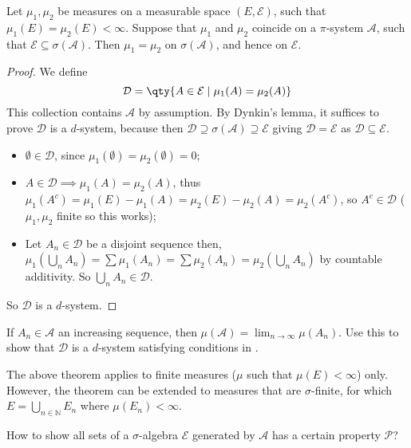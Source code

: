 \begin{theorem} \label{thm:uni}
	Let $\mu_1, \mu_2$ be measures on a measurable space $(E, \mathcal E)$, such that $\mu_1(E) = \mu_2(E) < \infty$.
	Suppose that $\mu_1$ and $\mu_2$ coincide on a $\pi$-system $\mathcal A$, such that $\mathcal E \subseteq \sigma(\mathcal A)$.
	Then $\mu_1 = \mu_2$ on $\sigma(\mathcal A)$, and hence on $\mathcal E$.
\end{theorem}

\begin{proof}
	We define
	\[ \mathcal D = \qty{A \in \mathcal E \mid \mu_1(A) = \mu_2(A)} \]
	This collection contains $\mathcal A$ by assumption.
	By Dynkin's lemma, it suffices to prove $\mathcal D$ is a $d$-system, because then $\mathcal D \supseteq \sigma(\mathcal A) \supseteq \mathcal E$ giving $\mathcal D = \mathcal E$ as $\mathcal{D} \subseteq \mathcal{E}$.

	\begin{itemize}
		\item $\emptyset \in \mathcal{D}$, since $\mu_1(\emptyset) = \mu_2(\emptyset) = 0$;
		\item $A \in \mathcal{D} \implies \mu_1(A) = \mu_2(A)$, thus $\mu_1(A^c) = \mu_1(E) - \mu_1(A) = \mu_2(E) - \mu_2(A) = \mu_2(A^c)$, so $A^c \in \mathcal{D}$ ($\mu_1, \mu_2$ finite so this works);
		\item Let $A_n \in \mathcal{D}$ be a disjoint sequence then, $\mu_1(\bigcup_n A_n) = \sum \mu_1(A_n) = \sum \mu_2(A_n) = \mu_2(\bigcup_n A_n)$ by countable additivity. So $\bigcup_n A_n \in \mathcal{D}$.
	\end{itemize}
	So $\mathcal{D}$ is a $d$-system.
\end{proof}

\begin{remark}
	If $A_n \in \mathcal{A}$ an increasing sequence, then $\mu(\mathcal{A}) = \lim_{n \to \infty} \mu(A_n)$.
	Use this to show that $\mathcal{D}$ is a $d$-system satisfying conditions in .

	The above theorem applies to finite measures ($\mu$ such that $\mu(E) < \infty$) only.
	However, the theorem can be extended to measures that are $\sigma$-finite, for which $E = \bigcup_{n \in \mathbb N} E_n$ where $\mu(E_n) < \infty$.
\end{remark}

\begin{question}
	How to show all sets of a $\sigma$-algebra $\mathcal{E}$ generated by $\mathcal{A}$ has a certain property $\mathcal{P}$?
\end{question}

